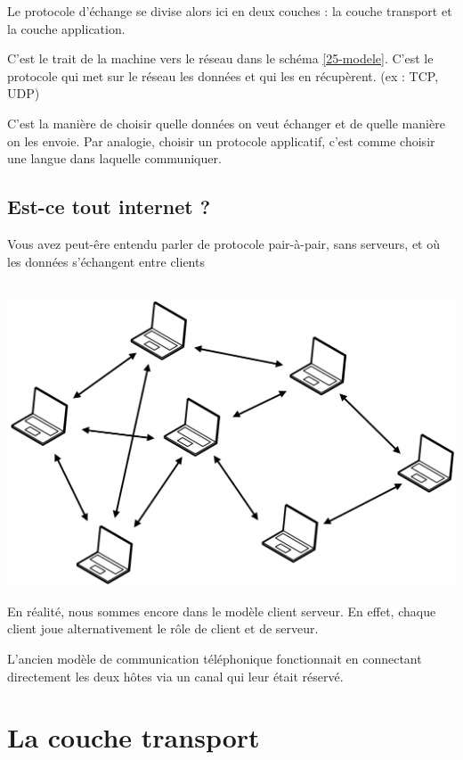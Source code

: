 Le protocole d'échange se divise alors ici en deux couches : la couche transport et la couche application.

\begin{definition}
	 C'est le trait de la machine vers le réseau dans le schéma \ref{25-modele}. C'est le protocole qui met sur le réseau les données et qui les en récupèrent. (ex : TCP, UDP)
\end{definition}

\begin{definition}
	C'est la manière de choisir quelle données on veut échanger et de quelle manière on les envoie. Par analogie, choisir un protocole applicatif, c'est comme choisir une langue dans laquelle communiquer.
\end{definition}

\subsection{Est-ce tout internet ?}

Vous avez peut-êre entendu parler de protocole pair-à-pair, sans serveurs, et où les données s'échangent entre clients

\begin{personalise}[Schéma]\\
	\includegraphics[width=0.5\linewidth]{lecon/25-client-serveur/pair-a-pair.png}
\end{personalise}

En réalité, nous sommes encore dans le modèle client serveur. En effet, chaque client joue alternativement le rôle de client et de serveur.

\begin{rem}
	L'ancien modèle de communication téléphonique fonctionnait en connectant directement les deux hôtes via un canal qui leur était réservé.
\end{rem}

\section{La couche transport}

